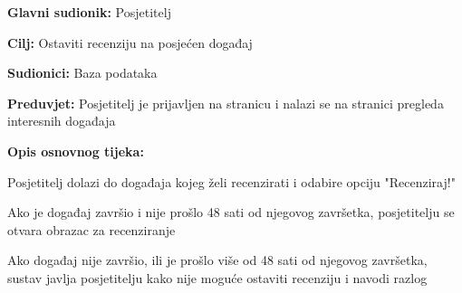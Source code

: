 					\noindent {}
\begin{packed_item}
	\item \textbf{Glavni sudionik:} Posjetitelj
	\item  \textbf{Cilj:} Ostaviti recenziju na posjećen događaj
	\item  \textbf{Sudionici:} Baza podataka
	\item  \textbf{Preduvjet:} Posjetitelj je prijavljen na stranicu i nalazi se na stranici pregleda interesnih događaja
	\item  \textbf{Opis osnovnog tijeka:}
	
	\item[] \begin{packed_enum}
		
		\item Posjetitelj dolazi do događaja kojeg želi recenzirati i odabire opciju "Recenziraj!"
		\item Ako je događaj završio i nije prošlo 48 sati od njegovog završetka, posjetitelju se otvara obrazac za recenziranje
		\item Ako događaj nije završio, ili je prošlo više od 48 sati od njegovog završetka, sustav javlja posjetitelju kako nije moguće ostaviti recenziju i navodi razlog
	\end{packed_enum}
	
\end{packed_item}


